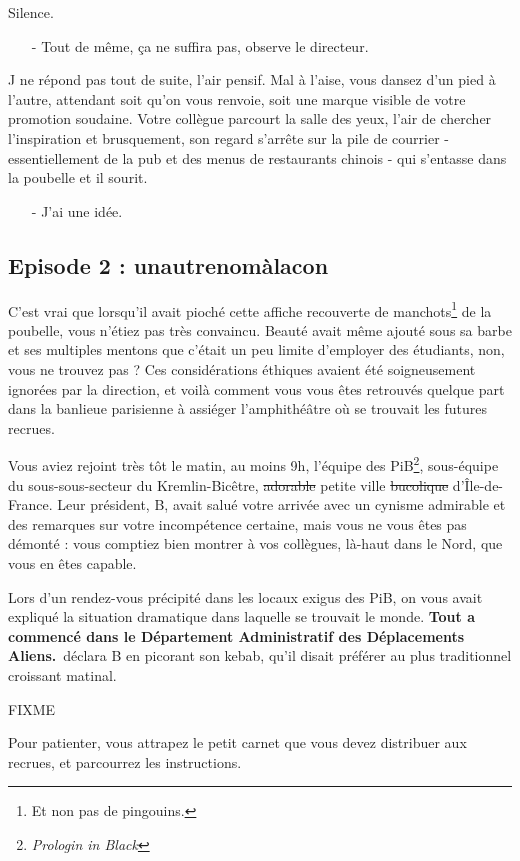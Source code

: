 Silence.

\begin{itemize}
\item[-] Tout de même, ça ne suffira pas, observe le directeur.
\end{itemize}

J ne répond pas tout de suite, l'air pensif. Mal à l'aise, vous dansez d'un
pied à l'autre, attendant soit qu'on vous renvoie, soit une marque visible de
votre promotion soudaine. Votre collègue parcourt la salle des yeux, l'air de
chercher l'inspiration et brusquement, son regard s'arrête sur la pile de
courrier - essentiellement de la pub et des menus de restaurants chinois -
qui s'entasse dans la poubelle et il sourit.

\begin{itemize}
\item[-] J'ai une idée.
\end{itemize}

\subsection{Episode 2 : unautrenomàlacon}

C'est vrai que lorsqu'il avait pioché cette affiche recouverte de
manchots\footnote{Et non pas de pingouins.} de la poubelle, vous n'étiez pas
très convaincu. Beauté avait même ajouté sous sa barbe et ses multiples
mentons que c'était un peu limite d'employer des étudiants, non, vous ne
trouvez pas ?
Ces considérations éthiques avaient été soigneusement ignorées par la
direction, et voilà comment vous vous êtes retrouvés quelque part dans la
banlieue parisienne à assiéger l'amphithéâtre où se trouvait les futures
recrues.

Vous aviez rejoint très tôt le matin, au moins 9h, l'équipe des PiB\footnote{\emph{Prologin in
Black}\texttrademark}, sous-équipe du sous-sous-secteur du Kremlin-Bicêtre,
\st{adorable} petite ville \st{bucolique} d'Île-de-France. Leur président,
B, avait salué votre arrivée avec un cynisme admirable et des remarques sur
votre incompétence certaine, mais vous ne vous êtes pas démonté : vous
comptiez bien montrer à vos collègues, là-haut dans le Nord, que vous en êtes
capable.

Lors d'un rendez-vous précipité dans les locaux exigus des PiB, on vous avait
expliqué la situation dramatique dans laquelle se trouvait le monde.
\guillemotleft \textbf{Tout a commencé dans le Département Administratif des Déplacements
Aliens.}\guillemotright \ déclara B en picorant son kebab, qu'il disait préférer
au plus traditionnel croissant matinal. 

FIXME

Pour patienter, vous attrapez le petit carnet que vous devez distribuer aux
recrues, et parcourrez les instructions.
